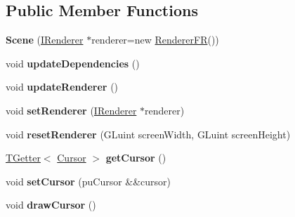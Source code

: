 \subsection*{Public Member Functions}
\begin{DoxyCompactItemize}
\item 
{\bfseries Scene} (\hyperlink{classflw_1_1flf_1_1IRenderer}{I\+Renderer} $\ast$renderer=new \hyperlink{classflw_1_1flf_1_1RendererFR}{Renderer\+FR}())\hypertarget{classflw_1_1flf_1_1Scene_a1ceaacc66862e2076c90c0950adf5a6e}{}\label{classflw_1_1flf_1_1Scene_a1ceaacc66862e2076c90c0950adf5a6e}

\item 
void {\bfseries update\+Dependencies} ()\hypertarget{classflw_1_1flf_1_1Scene_ae08f1db7a2c35bfa3f0a24ad7c9a46d8}{}\label{classflw_1_1flf_1_1Scene_ae08f1db7a2c35bfa3f0a24ad7c9a46d8}

\item 
void {\bfseries update\+Renderer} ()\hypertarget{classflw_1_1flf_1_1Scene_a196bb868974bc3c5f6865ca821461174}{}\label{classflw_1_1flf_1_1Scene_a196bb868974bc3c5f6865ca821461174}

\item 
void {\bfseries set\+Renderer} (\hyperlink{classflw_1_1flf_1_1IRenderer}{I\+Renderer} $\ast$renderer)\hypertarget{classflw_1_1flf_1_1Scene_ae870562f7634904be71e557b6da17881}{}\label{classflw_1_1flf_1_1Scene_ae870562f7634904be71e557b6da17881}

\item 
void {\bfseries reset\+Renderer} (G\+Luint screen\+Width, G\+Luint screen\+Height)\hypertarget{classflw_1_1flf_1_1Scene_a3414f963a43c363a7038caba861ebf0c}{}\label{classflw_1_1flf_1_1Scene_a3414f963a43c363a7038caba861ebf0c}

\item 
\hyperlink{classflw_1_1TGetter}{T\+Getter}$<$ \hyperlink{classflw_1_1flf_1_1Cursor}{Cursor} $>$ {\bfseries get\+Cursor} ()\hypertarget{classflw_1_1flf_1_1Scene_a8cec08d2b8e5d96db819a07f4d45fa6c}{}\label{classflw_1_1flf_1_1Scene_a8cec08d2b8e5d96db819a07f4d45fa6c}

\item 
void {\bfseries set\+Cursor} (pu\+Cursor \&\&cursor)\hypertarget{classflw_1_1flf_1_1Scene_a7a13521bfe9a7934e68896c9555198f4}{}\label{classflw_1_1flf_1_1Scene_a7a13521bfe9a7934e68896c9555198f4}

\item 
void {\bfseries draw\+Cursor} ()\hypertarget{classflw_1_1flf_1_1Scene_a3fb07bdaee525b5aea45573353a9673d}{}\label{classflw_1_1flf_1_1Scene_a3fb07bdaee525b5aea45573353a9673d}


\end{DoxyCompactItemize}
